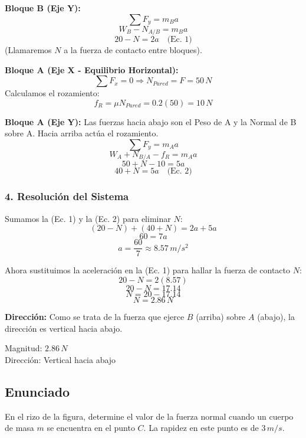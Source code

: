 \documentclass[12pt, a4paper]{article}
\begin{document}
\textbf{Bloque B (Eje Y):}
$$ \sum F_y = m_B a $$
$$ W_B - N_{A/B} = m_B a $$
$$ 20 - N = 2a \quad \text{(Ec. 1)} $$
(Llamaremos $N$ a la fuerza de contacto entre bloques).

\textbf{Bloque A (Eje X - Equilibrio Horizontal):}
$$ \sum F_x = 0 \Rightarrow N_{Pared} = F = 50 \, \si{N} $$
Calculamos el rozamiento:
$$ f_R = \mu N_{Pared} = 0.2(50) = 10 \, \si{N} $$

\textbf{Bloque A (Eje Y):}
Las fuerzas hacia abajo son el Peso de A y la Normal de B sobre A. Hacia arriba actúa el rozamiento.
$$ \sum F_y = m_A a $$
$$ W_A + N_{B/A} - f_R = m_A a $$
$$ 50 + N - 10 = 5a $$
$$ 40 + N = 5a \quad \text{(Ec. 2)} $$

\subsubsection*{4. Resolución del Sistema}
Sumamos la (Ec. 1) y la (Ec. 2) para eliminar $N$:
$$ (20 - N) + (40 + N) = 2a + 5a $$
$$ 60 = 7a $$
$$ a = \frac{60}{7} \approx 8.57 \, \si{m/s^2} $$

Ahora sustituimos la aceleración en la (Ec. 1) para hallar la fuerza de contacto $N$:
$$ 20 - N = 2(8.57) $$
$$ 20 - N = 17.14 $$
$$ N = 20 - 17.14 $$
$$ N = 2.86 \, \si{N} $$

\textbf{Dirección:} Como se trata de la fuerza que ejerce $B$ (arriba) sobre $A$ (abajo), la dirección es vertical hacia abajo.

\begin{tcolorbox}[colback=green!5!white, colframe=green!50!black, title=Respuesta Final]
\centering
Magnitud: $2.86 \, \si{N}$ \\
Dirección: Vertical hacia abajo
\end{tcolorbox}

\newpage

\subsection*{Enunciado}
En el rizo de la figura, determine el valor de la fuerza normal cuando un cuerpo de masa $m$ se encuentra en el punto $C$. La rapidez en este punto es de $3 \, \si{m/s}$.
\end{document}
